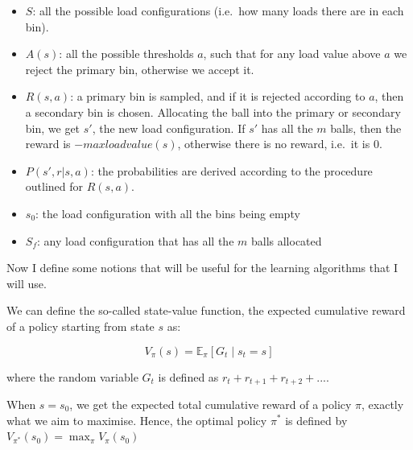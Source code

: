 \begin{itemize}[itemsep=0pt]
    \item 
    $S$: all the possible load configurations (i.e.\ how many loads there are in each bin).
    \item
    $A(s)$: all the possible thresholds $a$, such that for any load value above $a$ we reject the primary bin, otherwise we accept it.
    \item
    $R(s, a)$: a primary bin is sampled, and if it is rejected according to $a$, then a secondary bin is chosen. Allocating the ball into the primary or secondary bin, we get $s'$, the new load configuration. If $s'$ has all the $m$ balls, then the reward is $-maxloadvalue(s)$, otherwise there is no reward, i.e.\ it is $0$.
    \item
    $P(s', r | s, a)$: the probabilities are derived according to the procedure outlined for $R(s,a)$.
    \item
    $s_0$: the load configuration with all the bins being empty
    \item
    $S_f$: any load configuration that has all the $m$ balls allocated
\end{itemize}


Now I define some notions that will be useful for the learning algorithms that I will use.


We can define the so-called state-value function, the expected cumulative reward of a policy starting from state $s$ as:

\begin{equation}\label{eq:statevalueFunction}
V_{\pi}(s)=\mathbb{E}_\pi[G_t \mid s_t = s]
\end{equation}

where the random variable $G_t$ is defined as $r_{t} +  r_{t+1} + r_{t+2} + ...$.

When $s=s_0$, we get the expected total cumulative reward of a policy $\pi$, exactly what we aim to maximise. Hence, the optimal policy $\pi^*$ is defined by $V_{\pi^*}(s_0)=\max_\pi V_{\pi}(s_0)$

